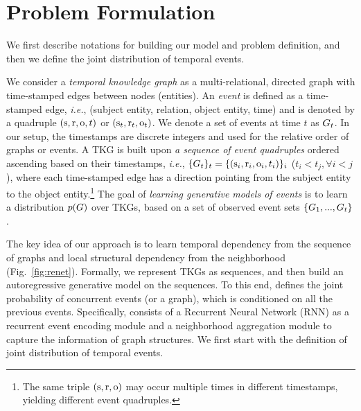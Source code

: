 

\section{Problem Formulation}
\label{sec:tkg}

We first describe notations for building our model and problem definition, and then we define the joint distribution of temporal events. 

We consider a \textit{temporal knowledge graph} as a multi-relational, directed graph with time-stamped edges between nodes (entities).
An \textit{event} is defined as a time-stamped edge, \textit{i.e.}, (subject entity, relation, object entity, time) and is denoted by a quadruple $(\mathrm{s},\mathrm{r},\mathrm{o},t)$ or $(\mathrm{s}_t, \mathrm{r}_t, \mathrm{o}_t)$. We denote a set of events at time $t$ as ${G}_t$. 
In our setup, the timestamps are discrete integers and used for the relative order of graphs or events.
A TKG is built upon \textit{a sequence of event quadruples} ordered ascending based on their timestamps, \textit{i.e.}, $\{G_{t}\}_t = \{(\mathrm{s}_i,\mathrm{r}_i,\mathrm{o}_i,t_i)\}_i$ ($t_i < t_j, \forall i<j$), 
where each time-stamped edge has a direction pointing from the subject entity to the object entity.\footnote{The same triple $(\mathrm{s}, \mathrm{r}, \mathrm{o})$ may occur multiple times in different timestamps, yielding different event quadruples.}  
The goal of \textit{learning generative models of events} is to learn a distribution $p(G)$ over TKGs, based on a set of observed event sets $\{G_1, ..., G_t\}$. 



The key idea of our approach is to learn temporal dependency from the sequence of graphs and local structural dependency from the neighborhood (Fig.~\ref{fig:renet}). 
Formally, we represent TKGs as sequences, and then build an autoregressive generative model on the sequences.
To this end, \method defines the joint probability of concurrent events (or a graph), which is conditioned on all the previous events.
Specifically, \method consists of a Recurrent Neural Network (RNN) as a recurrent event encoding module and a neighborhood aggregation module to capture the information of graph structures.
We first start with the definition of joint distribution of temporal events.



